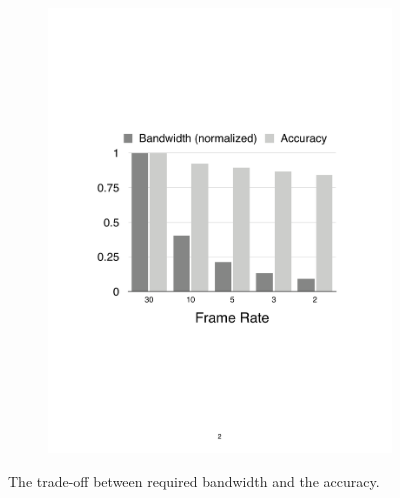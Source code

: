 \begin{figure}
\begin{subfigure}{.48\columnwidth}
    \includegraphics[width=.95\linewidth]{figures/motiv-framerate.pdf}
    \label{fig:log-acc}
  \end{subfigure}
  \caption{The trade-off between required bandwidth and the accuracy.}
  \label{fig:log-trade-off}
\end{figure}

